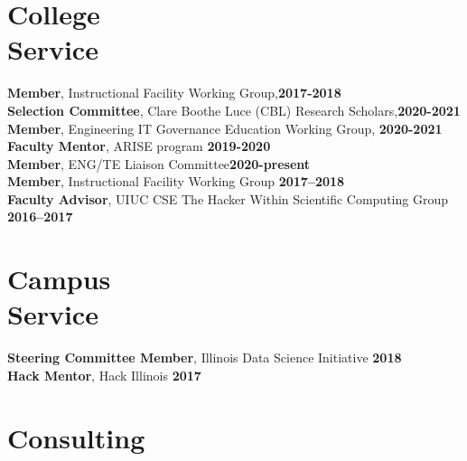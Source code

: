 \documentclass[margin,line]{resume}
\begin{document}
\begin{resume}
    \section{\mysidestyle College\\Service}
            \textbf{Member}, Instructional Facility Working Group,\hfill \textbf{2017-2018}\vspace{.5mm}\\%
            \textbf{Selection Committee}, Clare Boothe Luce (CBL) Research Scholars,\hfill \textbf{2020-2021}\vspace{.5mm}\\%
            \textbf{Member}, Engineering IT Governance Education Working Group, \hfill\textbf{2020-2021}\vspace{.5mm}\\%
            \textbf{Faculty Mentor}, ARISE program \hfill \textbf{2019-2020}\vspace{.5mm}\\%
                \textbf{Member}, ENG/TE Liaison Committee\hfill \textbf{2020-present}\vspace{.5mm}\\%
                \textbf{Member}, Instructional Facility Working Group \hfill \textbf{2017--2018}\vspace{.5mm}\\%
                \textbf{Faculty Advisor}, UIUC CSE The Hacker Within Scientific Computing Group \hfill \textbf{2016--2017}\vspace{.5mm}\\%
    \section{\mysidestyle Campus\\Service}
                \textbf{Steering Committee Member}, Illinois Data Science Initiative \hfill \textbf{2018}\vspace{.5mm}\\%
                \textbf{Hack Mentor}, Hack Illinois \hfill \textbf{2017}\vspace{.5mm}\\%

    \section{\mysidestyle Consulting}



\end{resume}
\end{document}
